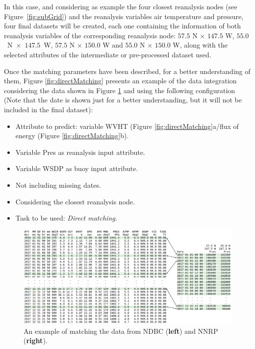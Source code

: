 \documentclass[energies,article,accept,moreauthors,pdftex]{Definitions/mdpi}
\begin{document}
\begin{paracol}{2}
\begin{itemize}
\begin{itemize}
							In this case, and considering as example the four closest reanalysis nodes (see \mbox{Figure  \ref{fig:subGrid}}) and the reanalysis variables air temperature and pressure, four final datasets will be created, each one containing the information of both reanalysis variables of the corresponding reanalysis node: $57.5$ N $\times$ $147.5$ W, \mbox{$55.0$ N $\times$ $147.5$ W}, $57.5$ N $\times$ $150.0$ W and $55.0$ N $\times$ $150.0$ W, along with the selected attributes of the intermediate or pre-processed dataset used.
							
						\end{itemize}
					
				\end{itemize}
						
				Once the matching parameters have been described, for a better understanding of them, Figure \ref{fig:directMatching} presents an example of the data integration considering the data shown in Figure \ref{fig:matchingProcess} and using the following configuration (Note that the date is shown just for a better understanding, but it will not be included in the final dataset):
					\begin{itemize}
						\item Attribute to predict: variable WVHT (Figure  \ref{fig:directMatching}a/flux of energy (Figure  \ref{fig:directMatching}b).
						\item Variable Pres as reanalysis input attribute.
						\item Variable WSDP as buoy input attribute.
						\item Not including missing dates.
						\item Considering the closest reanalysis node.
						\item Task to be used: \textit{Direct matching}.
					\end{itemize}
					
\end{paracol}
\nointerlineskip
	\begin{figure}[H]
\widefigure
					\includegraphics[scale=0.42]{figures/FigureMatchingProcess.png}
					\caption{An example of matching the data from NDBC (\textbf{left}) and NNRP (\textbf{right}).}
					\label{fig:matchingProcess}
				\end{figure}
\vspace{-6pt}
\end{document}
